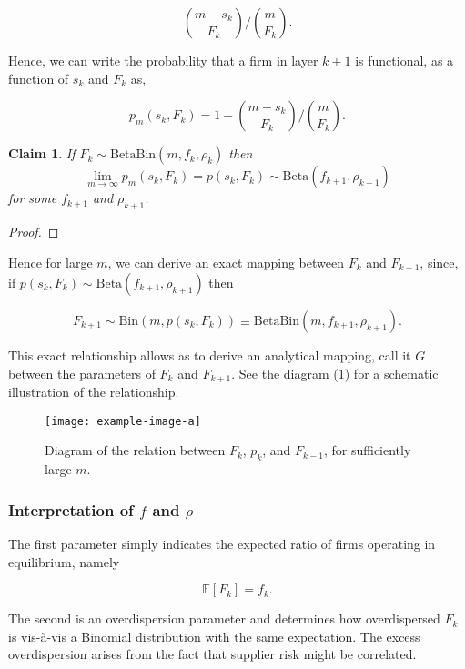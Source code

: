 \documentclass[american, abstract=on]{scrartcl}
\newcommand{\inputTikZ}[2]{%
        \scalebox{#1}{}  
      }
\theoremstyle{plain}
\newtheorem{claim}{Claim}
\newcommand{\E}{\mathbb{E}}
\newcommand{\Beta}{\text{Beta}}
\newcommand{\Bin}{\text{Bin}}
\begin{document}
\begin{equation}
  \binom{m - s_k}{F_k} \Bigg/ \binom{m}{F_k}.
\end{equation}

Hence, we can write the probability that a firm in layer $k + 1$ is functional, as a function of $s_k$ and $F_k$ as,

\begin{equation}
  p_m(s_k, F_k) = 1 - \binom{m - s_k}{F_k} \Bigg/ \binom{m}{F_k}.
\end{equation}

\begin{claim}
  If $F_k \sim \Beta\Bin(m, f_k, \rho_k)$ then \begin{equation*}\lim_{m \rightarrow \infty} p_m(s_k, F_k) = p(s_k, F_k) \sim \Beta(f_{k + 1}, \rho_{k + 1})\end{equation*} for some $f_{k + 1}$ and $\rho_{k + 1}$.
\end{claim}

\begin{proof}
  \color{red}{TODO!}
\end{proof}

Hence for large $m$, we can derive an exact mapping between $F_k$ and $F_{k + 1}$, since, if $p(s_k, F_k) \sim \Beta(f_{k + 1}, \rho_{k + 1})$ then

\begin{equation}
  F_{k+1}\sim \Bin(m, p(s_k, F_k)) \equiv \Beta\Bin(m, f_{k + 1}, \rho_{k + 1}).
\end{equation}

This exact relationship allows as to derive an analytical mapping, call it $G$ between the parameters of $F_k$ and $F_{k + 1}$. See the diagram (\ref{fig:propagation-of-risk}) for a schematic illustration of the relationship.

\begin{figure}[H]
  \centering
  \texttt{[image: example-image-a]}
  \caption{Diagram of the relation between $F_k$, $p_k$, and $F_{k - 1}$, for sufficiently large $m$.}
  \label{fig:propagation-of-risk}
\end{figure}

\subsubsection[Interpretation of the parameters]{Interpretation of $f$ and $\rho$}

The first parameter simply indicates the expected ratio of firms operating in equilibrium, namely

\begin{equation}
  \E[F_k] = f_k.
\end{equation}

The second is an overdispersion parameter and determines how overdispersed $F_k$ is vis-à-vis a Binomial distribution with the same expectation. The excess overdispersion arises from the fact that supplier risk might be correlated.

\newpage
\nocite{*}
\printbibliography
\end{document}

